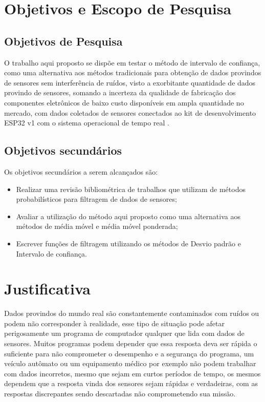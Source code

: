 \section{Objetivos e Escopo de Pesquisa}
\subsection{Objetivos de Pesquisa}
O trabalho aqui proposto se dispõe em testar o método de intervalo de confiança, como uma alternativa aos métodos tradicionais para obtenção de dados provindos de sensores sem interferência de ruídos, visto a exorbitante quantidade de dados provindo de sensores, somando a incerteza da qualidade de fabricação dos componentes eletrônicos de baixo custo disponíveis em ampla quantidade no mercado, com dados coletados de sensores conectados ao kit de desenvolvimento ESP32 v1 com o sistema operacional de tempo real \cite{Zephyr}.


\subsection{Objetivos secundários}
Os objetivos secundários a serem alcançados são:
\begin{itemize}
\item Realizar uma revisão bibliométrica de trabalhos que utilizam de métodos probabilísticos para filtragem de dados de sensores;
\item Avaliar a utilização do método aqui proposto como uma alternativa aos métodos de média móvel e média móvel ponderada;
\item Escrever funções de filtragem utilizando os métodos de Desvio padrão e Intervalo de confiança.
\end{itemize}


\section{Justificativa}
Dados provindos do mundo real são constantemente contaminados com ruídos ou podem não corresponder à realidade, esse tipo de situação pode afetar perigosamente um programa de computador qualquer que lida com dados de sensores. Muitos programas podem depender que essa resposta deva ser rápida o suficiente para não comprometer o desempenho e a segurança do programa, um veículo autômato ou um equipamento médico por exemplo não podem trabalhar com dados incorretos, mesmo que sejam em curtos períodos de tempo, os mesmos dependem que a resposta vinda dos sensores sejam rápidas e verdadeiras, com as respostas discrepantes sendo descartadas não comprometendo sua missão. 

